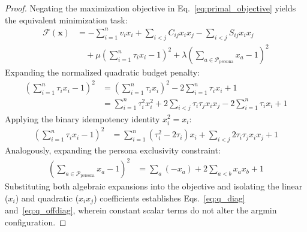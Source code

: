 \documentclass[review,12pt,times,authoryear]{elsarticle}
\theoremstyle{definition}
\begin{document}
\begin{proof}
Negating the maximization objective in Eq.~\eqref{eq:primal_objective} yields the equivalent minimization task:
\begin{align}
  \mathcal{F}(\bm{x}) &= -\sum_{i=1}^n v_i x_i + \sum_{i < j} C_{ij} x_i x_j - \sum_{i < j} S_{ij} x_i x_j \nonumber \\
  &\quad + \mu \left(\sum_{i=1}^n \tau_i x_i - 1\right)^2 + \lambda \left(\sum_{a \in \mathcal{P}_{\mathrm{persona}}} x_a - 1\right)^2
\end{align}
Expanding the normalized quadratic budget penalty:
\begin{align}
  \left(\sum_{i=1}^n \tau_i x_i - 1\right)^2 &= \left(\sum_{i=1}^n \tau_i x_i\right)^2 - 2 \sum_{i=1}^n \tau_i x_i + 1 \nonumber \\
  &= \sum_{i=1}^n \tau_i^2 x_i^2 + 2 \sum_{i < j} \tau_i \tau_j x_i x_j - 2 \sum_{i=1}^n \tau_i x_i + 1
\end{align}
Applying the binary idempotency identity $x_i^2 = x_i$:
\begin{align}
  \left(\sum_{i=1}^n \tau_i x_i - 1\right)^2 &= \sum_{i=1}^n (\tau_i^2 - 2 \tau_i) x_i + \sum_{i < j} 2 \tau_i \tau_j x_i x_j + 1
\end{align}
Analogously, expanding the persona exclusivity constraint:
\begin{align}
  \left(\sum_{a \in \mathcal{P}_{\mathrm{persona}}} x_a - 1\right)^2 &= \sum_{a} (-x_a) + 2 \sum_{a < b} x_a x_b + 1
\end{align}
Substituting both algebraic expansions into the objective and isolating the linear ($x_i$) and quadratic ($x_i x_j$) coefficients establishes Eqs.~\eqref{eq:q_diag} and~\eqref{eq:q_offdiag}, wherein constant scalar terms do not alter the argmin configuration.
\end{proof}
\end{document}

